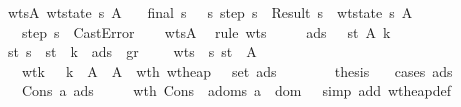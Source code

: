 \begin{isabellebody}
\ \ \ wtsA{\isacharcolon}\ {\isachardoublequoteopen}wt{\isacharunderscore}state\ s\ A{\isachardoublequoteclose}\isanewline
\ \ \ {\isachardoublequoteopen}final\ s\ {\isasymor}\ {\isacharparenleft}{\isasymexists}\ s{\isacharprime}{\isachardot}\ step\ s\ {\isacharequal}\ Result\ s{\isacharprime}\ {\isasymand}\ wt{\isacharunderscore}state\ s{\isacharprime}\ A{\isacharparenright}\isanewline
\ \ \ \ {\isasymor}\ step\ s\ {\isacharequal}\ CastError{\isachardoublequoteclose}\isanewline
\isadelimproof
\ \ \endisadelimproof
\isatagproof
{}\isamarkupfalse \ wtsA\ \isanewline
{}\isamarkupfalse \ {\isacharparenleft}rule\ wts{\isacharparenright}\isanewline
\ \ \isamarkupfalse \ {\isasymSigma}\ {\isasymmu}\ ads\ {\isasymGamma}\ {\isasymrho}\ st\ A{\isacharprime}\ k\isanewline
\ \ \isamarkupfalse \ st{\isacharcolon}\ {\isachardoublequoteopen}s\ {\isacharequal}\ {\isacharparenleft}st{\isacharcomma}\ {\isasymrho}{\isacharcomma}\ k{\isacharcomma}\ {\isasymmu}{\isacharcomma}\ ads{\isacharparenright}{\isachardoublequoteclose}\ \ gr{\isacharcolon}\ {\isachardoublequoteopen}{\isasymGamma}{\isacharsemicolon}{\isasymSigma}\ {\isasymturnstile}\ {\isasymrho}{\isachardoublequoteclose}\ \ wts{\isacharcolon}\ {\isachardoublequoteopen}{\isasymGamma}\ {\isasymturnstile}\isactrlisub s\ st\ {\isacharcolon}\ A{\isacharprime}{\isachardoublequoteclose}\isanewline
\ \ \ \ \ wt{\isacharunderscore}k{\isacharcolon}\ {\isachardoublequoteopen}{\isasymSigma}\ {\isasymturnstile}\ k\ {\isacharcolon}\ A{\isacharprime}\ {\isasymRightarrow}\ A{\isachardoublequoteclose}\ \ wt{\isacharunderscore}h{\isacharcolon}\ {\isachardoublequoteopen}wt{\isacharunderscore}heap\ {\isasymSigma}\ {\isasymmu}\ {\isacharparenleft}set\ ads{\isacharparenright}{\isachardoublequoteclose}\isanewline
\ \ \ \ \isanewline
\ \ \isamarkupfalse \ {\isacharquery}thesis\isanewline
\ \ \isamarkupfalse \ {\isacharparenleft}cases\ ads{\isacharparenright}\isanewline
\ \ \ \ \isamarkupfalse \ {\isacharparenleft}Cons\ a\ ads{\isacharprime}{\isacharparenright}\isanewline
\ \ \ \ \isamarkupfalse \ wt{\isacharunderscore}h\ Cons\ \isamarkupfalse \ adoms{\isacharcolon}\ {\isachardoublequoteopen}a\ {\isasymin}\ dom\ {\isasymSigma}{\isachardoublequoteclose}\ \isamarkupfalse \ {\isacharparenleft}simp\ add{\isacharcolon}\ wt{\isacharunderscore}heap{\isacharunderscore}def{\isacharparenright}\ \isamarkupfalse \isanewline

\end{isabellebody}
